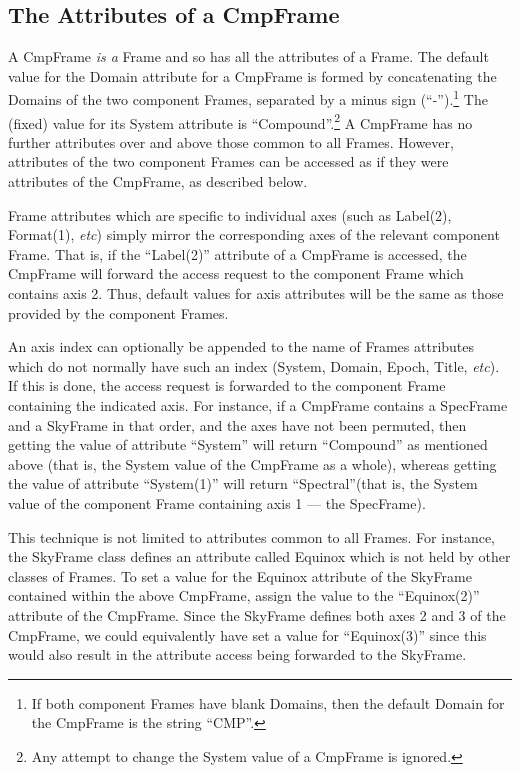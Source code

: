 \documentclass[twoside,11pt]{article}
\begin{document}
\subsection{The Attributes of a CmpFrame}

A CmpFrame \emph{is a} Frame and so has all the attributes of a Frame.
The default value for the Domain attribute for a CmpFrame is formed by
concatenating the Domains of the two component Frames, separated by a
minus sign (``-'').\footnote{If both component Frames have blank Domains,
then the default Domain for the CmpFrame is the string ``CMP''.} The (fixed)
value for its System attribute is ``Compound''.\footnote{Any attempt to
change the System value of a CmpFrame is ignored.} A CmpFrame has no
further attributes over and above those common to all Frames. However,
attributes of the two component Frames can be accessed as if they were
attributes of the CmpFrame, as described below.

Frame attributes which are specific to individual axes (such as Label(2),
Format(1), \emph{etc}) simply mirror the corresponding axes of the
relevant component Frame. That is, if the ``Label(2)'' attribute of a
CmpFrame is accessed, the CmpFrame will forward the access request to the
component Frame which contains axis 2. Thus, default values for axis
attributes will be the same as those provided by the component Frames.

An axis index can optionally be appended to the name of Frames attributes
which do not normally have such an index (System, Domain, Epoch, Title,
\emph{etc}). If this is done, the access request is forwarded to the
component Frame containing the indicated axis. For instance, if a
CmpFrame contains a SpecFrame and a SkyFrame in that order, and the axes
have not been permuted, then getting the value of attribute ``System'' will
return  ``Compound'' as mentioned above (that is, the System value of the
CmpFrame as a whole), whereas getting the value of attribute
``System(1)'' will return ``Spectral''(that is, the System value of the
component Frame containing axis 1 --- the SpecFrame).

This technique is not limited to attributes common to all Frames. For
instance, the SkyFrame class defines an attribute called Equinox which is
not held by other classes of Frames. To set a value for the Equinox
attribute of the SkyFrame contained within the above CmpFrame, assign the
value to the ``Equinox(2)'' attribute of the CmpFrame. Since the SkyFrame
defines both axes 2 and 3 of the CmpFrame, we could equivalently have set
a value for ``Equinox(3)'' since this would also result in the attribute
access being forwarded to the SkyFrame.
\end{document}
